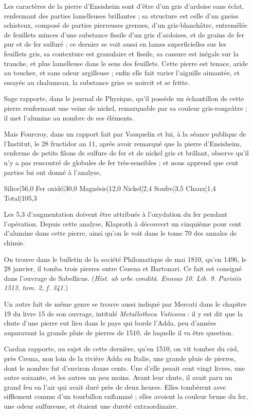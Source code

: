 \documentclass[a4paper, 12pt, oneside, french]{article}
\begin{document}
Les caractères de la pierre d'Ensisheim sont d'être d'un gris d'ardoise sans éclat, renfermant des parties lamelleuses brillantes ; sa structure est celle d'un gneiss schisteux, composé de parties pierreuses grenues, d'un gris-blanchâtre, entremêlée de feuillets minces d'une substance fissile d'un gris d'ardoises, et de grains de fer pur et de fer sulfuré ; ce dernier se voit aussi en lames superficielles sur les feuillets gris, sa contexture est granulaire et fissile, sa cassure est inégale sur la tranche, et plus lamelleuse dans le sens des feuillets. Cette pierre est tenace, aride au toucher, et sans odeur argilleuse ; enfin elle fait varier l'aiguille aimantée, et essayée au chalumeau, la substance grise se noircit et se fritte.

Sage rapporte, dans le journal de Physique, qu'il possède un échantillon de cette pierre renfermant une veine de nickel, remarquable par sa couleur gris-rougeâtre ; il met l'alumine au nombre de ses éléments.

Mais Fourcroy, dans un rapport fait par Vauquelin et lui, à la séance publique de l'Institut, le 28 fructidor an 11, après avoir remarqué que la pierre d'Ensisheim, renferme de petits filons de sulfure de fer et de nickel gris et brillant, observe qu'il n'y a pas rencontré de globules de fer très-sensibles ; et nous apprend que cent parties lui ont donné à l'analyse,

Silice|56,0  
Fer oxidé|30,0  
Magnésie|12,0  
Nickel|2,4  
Soufre|3,5  
Chaux|1,4  
Total|105,3

Les 5,3 d'augmentation doivent être attribués à l'oxydation du fer pendant l'opération. Depuis cette analyse, Klaproth à découvert un cinquième pour cent d'alumine dans cette pierre, ainsi qu'on le voit dans le tome 70 des annales de chimie.

On trouve dans le bulletin de la société Philomatique de mai 1810, qu'en 1496, le 28 janvier, il tomba trois pierres entre Cezena et Bartonari. Ce fait est consigné dans l'ouvrage de Sabellicus. (\emph{Hist. ab urbe conditâ. Enneas 10. Lib. 9. Parisiis 1513, tom. 2, f. 341.})

Un autre fait de même genre se trouve aussi indiqué par Mercati dans le chapitre 19 du livre 15 de son ouvrage, intitulé \emph{Metallotheca Vaticana} : il y est dit que la chute d'une pierre eut lieu dans le pays qui borde l'Adda, peu d'années auparavant la grande pluie de pierres de 1510, de laquelle il va être question.

Cardan rapporte, au sujet de cette dernière, qu'en 1510, on vit tomber du ciel, près Crema, non loin de la rivière Adda en Italie, une grande pluie de pierres, dont le nombre fut d'environ douze cents. Une d'elle pesait cent vingt livres, une autre soixante, et les autres un peu moins. Avant leur chute, il avait paru un grand feu en l'air qui avait duré près de deux heures. Elles tombèrent avec sifflement comme d'un tourbillon enflammé ; elles avoient la couleur brune du fer, une odeur sulfureuse, et étaient une dureté extraordinaire.
\end{document}

